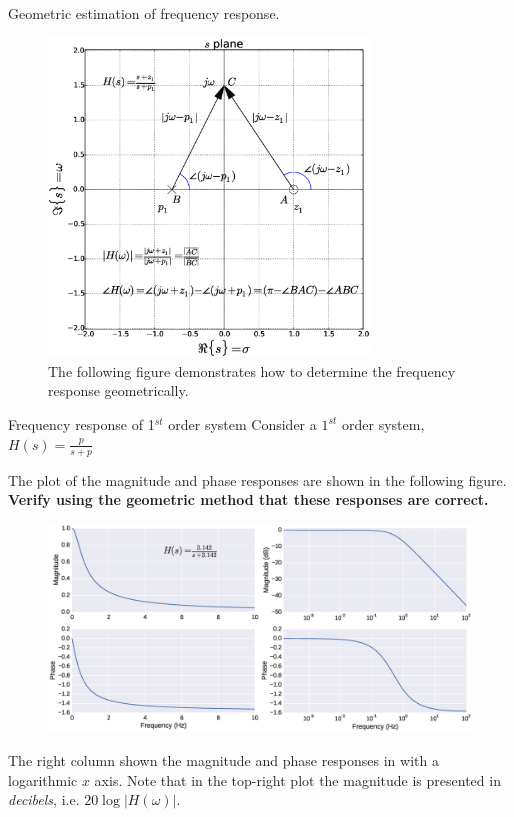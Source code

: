 \documentclass{beamer}
\begin{document}
\begin{frame}{Geometric estimation of frequency response.}
\vspace{-5mm}
\begin{figure}
\centering
\caption{\tiny{The following figure demonstrates how to determine the frequency response geometrically.}}
\vspace{-1mm}
\includegraphics[width=0.76\textwidth]{img/geo_freq_resp.eps}
\end{figure}

\end{frame}

\begin{frame}{Frequency response of 1$^{st}$ order system}
Consider a $1^{st}$ order system, $ H(s) = \frac{p}{s+p} $

\small{The plot of the magnitude and phase responses are shown in the following figure. \textbf{Verify using the geometric method that these responses are correct.}}
\vspace{-2mm}
\begin{figure}
\centering
\includegraphics[width=\textwidth]{img/1st_sys.eps}
\end{figure}
\vspace{-4mm}
\small{The right column shown the magnitude and phase responses in with a logarithmic $x$ axis. Note that in the top-right plot the magnitude is presented in \textit{decibels}, i.e. $20\log \left|H(\omega)\right|$.}
\end{frame}
\end{document}
